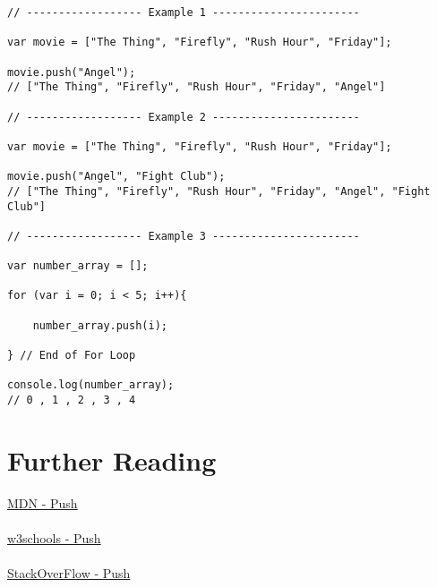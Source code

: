 \documentclass[12pt, letterpaper]{article}
\begin{document}
\begin{lstlisting}
// ------------------ Example 1 -----------------------

var movie = ["The Thing", "Firefly", "Rush Hour", "Friday"];

movie.push("Angel"); 
// ["The Thing", "Firefly", "Rush Hour", "Friday", "Angel"]

// ------------------ Example 2 -----------------------

var movie = ["The Thing", "Firefly", "Rush Hour", "Friday"];

movie.push("Angel", "Fight Club"); 
// ["The Thing", "Firefly", "Rush Hour", "Friday", "Angel", "Fight Club"]

// ------------------ Example 3 -----------------------

var number_array = [];

for (var i = 0; i < 5; i++){

	number_array.push(i);

} // End of For Loop

console.log(number_array);
// 0 , 1 , 2 , 3 , 4

\end{lstlisting}

\section*{Further Reading}

\href{https://developer.mozilla.org/en-US/docs/Web/JavaScript/Reference/Global_Objects/Array/push}{MDN - Push}\\
\\
\href{http://www.w3schools.com/jsref/jsref_push.asp}{w3schools - Push}\\
\\
\href{http://stackoverflow.com/questions/351409/appending-to-array}{StackOverFlow - Push}
\end{document}
